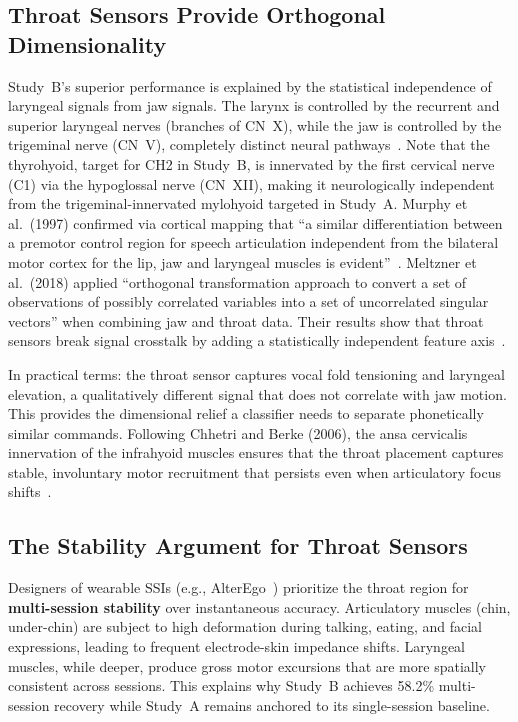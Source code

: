 \documentclass{article}
\begin{document}
\subsection{Throat Sensors Provide Orthogonal Dimensionality}

Study~B's superior performance is explained by the statistical independence of laryngeal signals from jaw signals. The larynx is controlled by the recurrent and superior laryngeal nerves (branches of CN~X), while the jaw is controlled by the trigeminal nerve (CN~V), completely distinct neural pathways~\cite{ala2018}. Note that the thyrohyoid, target for CH2 in Study~B, is innervated by the first cervical nerve (C1) via the hypoglossal nerve (CN~XII), making it neurologically independent from the trigeminal-innervated mylohyoid targeted in Study~A. Murphy et al.\ (1997) confirmed via cortical mapping that ``a similar differentiation between a premotor control region for speech articulation independent from the bilateral motor cortex for the lip, jaw and laryngeal muscles is evident''~\cite{murphy1997}. Meltzner et al.\ (2018) applied ``orthogonal transformation approach to convert a set of observations of possibly correlated variables into a set of uncorrelated singular vectors'' when combining jaw and throat data. Their results show that throat sensors break signal crosstalk by adding a statistically independent feature axis~\cite{meltzner2018}.

In practical terms: the throat sensor captures vocal fold tensioning and laryngeal elevation, a qualitatively different signal that does not correlate with jaw motion. This provides the dimensional relief a classifier needs to separate phonetically similar commands. Following Chhetri and Berke (2006), the ansa cervicalis innervation of the infrahyoid muscles ensures that the throat placement captures stable, involuntary motor recruitment that persists even when articulatory focus shifts~\cite{chhetri2006}.

\subsection{The Stability Argument for Throat Sensors}

Designers of wearable SSIs (e.g., AlterEgo~\cite{kapur2018}) prioritize the throat region for \textbf{multi-session stability} over instantaneous accuracy. Articulatory muscles (chin, under-chin) are subject to high deformation during talking, eating, and facial expressions, leading to frequent electrode-skin impedance shifts. Laryngeal muscles, while deeper, produce gross motor excursions that are more spatially consistent across sessions. This explains why Study~B achieves 58.2\% multi-session recovery while Study~A remains anchored to its single-session baseline.
\end{document}

